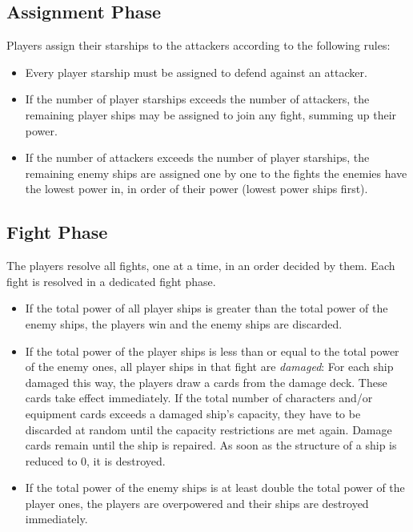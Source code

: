 \documentclass[11pt, a4paper]{article}
\begin{document}
\subsection{Assignment Phase}

Players assign their starships to the attackers according to the following
rules:

\begin{itemize}
 \item Every player starship must be assigned to defend against an attacker.
 \item If the number of player starships exceeds the number of attackers, the
remaining player ships may be assigned to join any fight, summing up their
power.
 \item If the number of attackers exceeds the number of player starships, the
remaining enemy ships are assigned one by one to the fights the enemies have
the lowest power in, in order of their power (lowest power ships first).
\end{itemize}

\subsection{Fight Phase}

The players resolve all fights, one at a time, in an order decided by them.
Each fight is resolved in a dedicated fight phase.

\begin{itemize}
 \item If the total power of all player ships is greater than the total power of
the enemy ships, the players win and the enemy ships are discarded.
 \item If the total power of the player ships is less than or equal to the total
power of the enemy ones, all player ships in that fight are \emph{damaged}: For
each ship damaged this way, the players draw a cards from the damage deck.
These cards take effect immediately. If the total number of characters and/or
equipment cards exceeds a damaged ship's capacity, they have to be discarded at
random until the capacity restrictions are met again. Damage cards remain until
the ship is repaired. As soon as the structure of a ship is reduced to 0, it is
destroyed.
 \item If the total power of the enemy ships is at least double the total power
of the player ones, the players are overpowered and their ships are destroyed
immediately.
\end{itemize}
\end{document}

